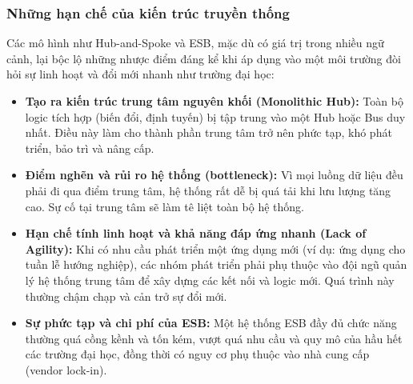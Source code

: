 \subsubsection{Những hạn chế của kiến trúc truyền thống}
Các mô hình như Hub-and-Spoke và ESB, mặc dù có giá trị trong nhiều ngữ cảnh, lại bộc lộ những nhược điểm đáng kể khi áp dụng vào một môi trường đòi hỏi sự linh hoạt và đổi mới nhanh như trường đại học:
\begin{itemize}
    \item \textbf{Tạo ra kiến trúc trung tâm nguyên khối (Monolithic Hub):} Toàn bộ logic tích hợp (biến đổi, định tuyến) bị tập trung vào một Hub hoặc Bus duy nhất. Điều này làm cho thành phần trung tâm trở nên phức tạp, khó phát triển, bảo trì và nâng cấp.
    \item \textbf{Điểm nghẽn và rủi ro hệ thống (bottleneck):} Vì mọi luồng dữ liệu đều phải đi qua điểm trung tâm, hệ thống rất dễ bị quá tải khi lưu lượng tăng cao. Sự cố tại trung tâm sẽ làm tê liệt toàn bộ hệ thống.
    \item \textbf{Hạn chế tính linh hoạt và khả năng đáp ứng nhanh (Lack of Agility):} Khi có nhu cầu phát triển một ứng dụng mới (ví dụ: ứng dụng cho tuần lễ hướng nghiệp), các nhóm phát triển phải phụ thuộc vào đội ngũ quản lý hệ thống trung tâm để xây dựng các kết nối và logic mới. Quá trình này thường chậm chạp và cản trở sự đổi mới.
    \item \textbf{Sự phức tạp và chi phí của ESB:} Một hệ thống ESB đầy đủ chức năng thường quá cồng kềnh và tốn kém, vượt quá nhu cầu và quy mô của hầu hết các trường đại học, đồng thời có nguy cơ phụ thuộc vào nhà cung cấp (vendor lock-in).
\end{itemize}

